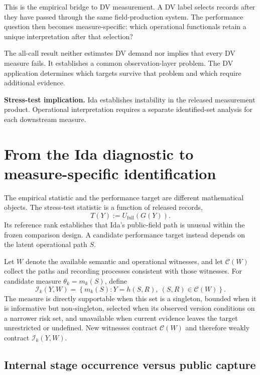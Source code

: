 \documentclass[11pt]{article}
\begin{document}
This is the empirical bridge to DV measurement. A DV label selects records after they have passed through the same field-production system. The performance question then becomes measure-specific: which operational functionals retain a unique interpretation after that selection?

The all-call result neither estimates DV demand nor implies that every DV measure fails. It establishes a common observation-layer problem. The DV application determines which targets survive that problem and which require additional evidence.

\begin{resultbox}
\textbf{Stress-test implication.} Ida establishes instability in the released measurement product. Operational interpretation requires a separate identified-set analysis for each downstream measure.
\end{resultbox}

\section{From the Ida diagnostic to measure-specific identification}

The empirical statistic and the performance target are different mathematical objects. The stress-test statistic is a function of released records,
\begin{equation}
T(Y):=U_{\mathrm{full}}(G(Y)).
\label{eq:diagnostic}
\end{equation}
Its reference rank establishes that Ida's public-field path is unusual within the frozen comparison design. A candidate performance target instead depends on the latent operational path $S$.

Let $W$ denote the available semantic and operational witnesses, and let $\mathcal C(W)$ collect the paths and recording processes consistent with those witnesses. For candidate measure $\theta_k=m_k(S)$, define
\begin{equation}
\mathcal I_k(Y,W)
=
\left\{m_k(S):Y=h(S,R),\ (S,R)\in\mathcal C(W)\right\}.
\label{eq:measure_set}
\end{equation}
The measure is directly supportable when this set is a singleton, bounded when it is informative but non-singleton, selected when its observed version conditions on a narrower risk set, and unavailable when current evidence leaves the target unrestricted or undefined. New witnesses contract $\mathcal C(W)$ and therefore weakly contract $\mathcal I_k(Y,W)$.

\subsection{Internal stage occurrence versus public capture}
\end{document}
